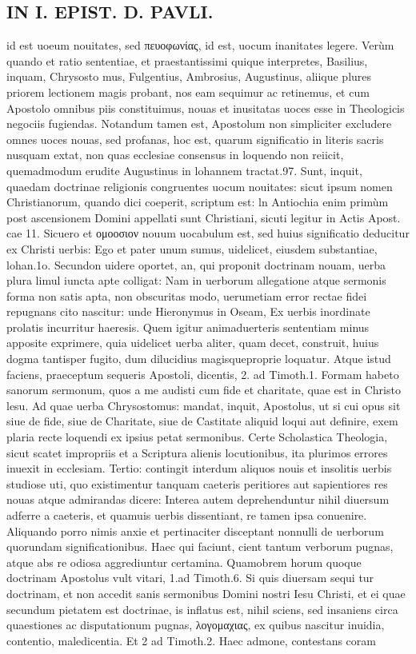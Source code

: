 \documentclass{article}
\begin{document}
\begin{pages}
\section*{IN I. EPIST. D. PAVLI. }
\marginpar{[ p.17 ]}\pstart id est uoeum nouitates, sed πευοφωνίας, id est, uocum inanitates legere. Verùm quando et ratio sententiae, et praestantissimi quique  interpretes, Basilius, inquam, Chrysosto mus, Fulgentius, Ambrosius, Augustinus, aliique  plures priorem lectionem magis probant, nos eam sequimur ac retinemus, et cum Apostolo omnibus piis constituimus, nouas et inusitatas uoces esse in Theologicis negociis fugiendas. Notandum tamen est, Apostolum non simpliciter excludere omnes uoces nouas, sed profanas, hoc est, quarum significatio in literis sacris nusquam extat, non quas ecclesiae consensus in loquendo non reiicit, quemadmodum erudite Augustinus in lohannem tractat.97. Sunt, inquit, quaedam doctrinae religionis congruentes uocum nouitates: sicut ipsum nomen Christianorum, quando dici coeperit, scriptum est: ln Antiochia enim primùm post ascensionem Domini appellati sunt Christiani, sicuti legitur in Actis Apost. cae 11. Sicuero et ομοοσιον nouum uocabulum est, sed huius significatio deducitur ex Christi uerbis: Ego et pater unum sumus, uidelicet, eiusdem substantiae, lohan.1o.  \pend\pstart Secundon uidere oportet, an, qui proponit doctrinam nouam, uerba plura limul iuncta apte colligat: Nam in uerborum allegatione atque sermonis forma non satis apta, non obscuritas modo, uerumetiam error rectae fidei repugnans cito nascitur: unde Hieronymus in Oseam, Ex uerbis inordinate prolatis incurritur haeresis. Quem igitur animaduerteris sententiam minus apposite exprimere, quia uidelicet uerba aliter, quam decet, construit, huius dogma tantisper fugito, dum dilucidius magisqueproprie loquatur. Atque  istud faciens, praeceptum sequeris Apostoli, dicentis, 2. ad Timoth.1.   Formam habeto sanorum sermonum, quos a me audisti cum fide et charitate, quae est   in Christo lesu. Ad quae uerba Chrysostomus: mandat, inquit, Apostolus, ut si cui opus sit siue de fide, siue de Charitate, siue de Castitate aliquid loqui aut definire, exem plaria recte loquendi ex ipsius petat sermonibus. Certe Scholastica Theologia, sicut scatet impropriis et a Scriptura alienis locutionibus, ita plurimos errores inuexit in ecclesiam.  \pend\pstart Tertio: contingit interdum aliquos nouis et insolitis uerbis studiose uti, quo existimentur tanquam caeteris peritiores aut sapientiores res nouas atque  admirandas dicere: Interea autem deprehenduntur nihil diuersum adferre a caeteris, et quamuis uerbis dissentiant, re tamen ipsa conuenire. Aliquando porro nimis anxie et pertinaciter disceptant nonnulli de uerborum quorundam significationibus. Haec qui faciunt, cient tantum verborum pugnas, atque  abs re odiosa aggrediuntur certamina. Quamobrem   horum quoque  doctrinam Apostolus vult vitari, 1.ad Timoth.6. Si quis diuersam sequi   tur doctrinam, et non accedit sanis sermonibus Domini nostri Iesu Christi, et ei quae   secundum pietatem est doctrinae, is inflatus est, nihil sciens, sed insaniens circa quaestiones ac disputationum pugnas, λογομαχιας, ex quibus nascitur inuidia, contentio, maledicentia. Et 2 ad Timoth.2. Haec admone, contestans coram 
\end{pages}
\end{document}
